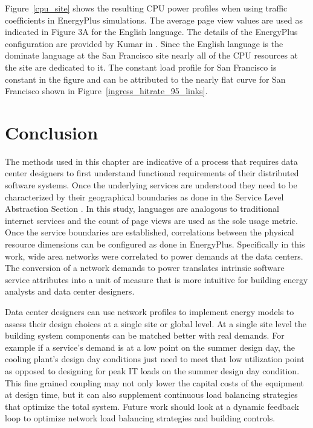     Figure~\ref{cpu_site} shows the resulting CPU power profiles when using traffic coefficients in EnergyPlus simulations. The average page view values are used as indicated in Figure 3A for the English language. The details of the EnergyPlus configuration are provided by Kumar in \cite{kumar20, kumar20b}. Since the English language is the dominate language at the San Francisco site nearly all of the CPU resources at the site are dedicated to it. The constant load profile for San Francisco is constant in the figure and can be attributed to the nearly flat curve for San Francisco shown in Figure~\ref{ingress_hitrate_95_links}. 
    
    
    
    
    
\section{Conclusion}
    The methods used in this chapter are indicative of a process that requires data center designers to first understand functional requirements of their distributed software systems. Once the underlying services are understood they need to be characterized by their geographical boundaries as done in the Service Level Abstraction Section . In this study, languages are analogous to traditional internet services and the count of page views are used as the sole usage metric. Once the service boundaries are established, correlations between the physical resource dimensions can be configured as done in EnergyPlus. Specifically in this work, wide area networks were correlated to power demands at the data centers. The conversion of a network demands to power translates intrinsic software service attributes into a unit of measure that is more intuitive for building energy analysts and data center designers. 

    Data center designers can use network profiles to implement energy models to assess their design choices at a single site or global level. At a single site level the building system components can be matched better with real demands. For example if a service’s demand is at a low point on the summer design day, the cooling plant’s design day conditions just need to meet that low utilization point as opposed to designing for peak IT loads on the summer design day condition. This fine grained coupling may not only lower the capital costs of the equipment at design time, but it can also supplement continuous load balancing strategies that optimize the total system. Future work should look at a dynamic feedback loop to optimize network load balancing strategies and building controls. 